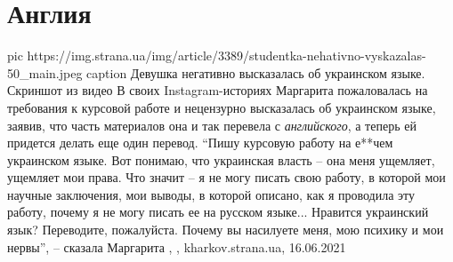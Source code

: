  
 
 
 
 
\chapter{Англия}

\ifcmt
  pic https://img.strana.ua/img/article/3389/studentka-nehativno-vyskazalas-50_main.jpeg
	caption Девушка негативно высказалась об украинском языке. Скриншот из видео
\fi
В своих Instagram-историях Маргарита пожаловалась на требования к курсовой
работе и нецензурно высказалась об украинском языке, заявив, что часть
материалов она и так перевела с \emph{английского}, а теперь ей придется делать еще
один перевод.  \enquote{Пишу курсовую работу на е**чем украинском языке. Вот понимаю,
что украинская власть – она меня ущемляет, ущемляет мои права. Что значит – я
не могу писать свою работу, в которой мои научные заключения, мои выводы, в
которой описано, как я проводила эту работу, почему я не могу писать ее на
русском языке... Нравится украинский язык? Переводите, пожалуйста. Почему вы
насилуете меня, мою психику и мои нервы}, – сказала Маргарита
, , kharkov.strana.ua, 16.06.2021

